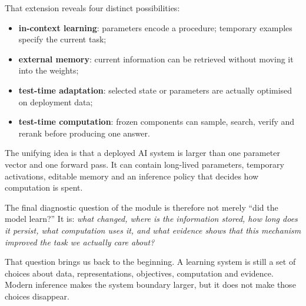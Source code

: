 That extension reveals four distinct possibilities:
\begin{itemize}[leftmargin=*]
  \item \textbf{in-context learning}: parameters encode a procedure; temporary examples specify the current task;
  \item \textbf{external memory}: current information can be retrieved without moving it into the weights;
  \item \textbf{test-time adaptation}: selected state or parameters are actually optimised on deployment data;
  \item \textbf{test-time computation}: frozen components can sample, search, verify and rerank before producing one answer.
\end{itemize}

The unifying idea is that a deployed AI system is larger than one parameter vector and one forward pass. It can contain long-lived parameters, temporary activations, editable memory and an inference policy that decides how computation is spent.

\begin{keyidea}
The final diagnostic question of the module is therefore not merely ``did the model learn?'' It is: \emph{what changed, where is the information stored, how long does it persist, what computation uses it, and what evidence shows that this mechanism improved the task we actually care about?}
\end{keyidea}

That question brings us back to the beginning. A learning system is still a set of choices about data, representations, objectives, computation and evidence. Modern inference makes the system boundary larger, but it does not make those choices disappear.
